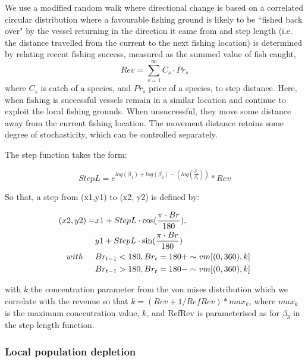 \documentclass[review]{elsarticle}
\begin{document}
We use a modified random walk where directional change is based on a correlated
circular distribution where a favourable fishing ground is likely to be ``fished
back over" by the vessel returning in the direction it came from and step
length (i.e. the distance travelled from the current to the next fishing
location) is determined by relating recent fishing success, measured as the
summed value of fish caught, $$Rev = \sum_{s=1}^{\infty} C_{s} \cdot Pr_{s}$$
where $C_{s}$ is catch of a species, and $Pr_{s}$ price of a species, to step
distance. Here, when fishing is successful vessels remain in a similar location
and continue to exploit the local fishing grounds. When unsuccessful, they move
some distance away from the current fishing location. The movement distance
retains some degree of stochasticity, which can be controlled separately. 

The step function takes the form:

\begin{equation*}
	StepL = e^{log(\beta_{1}) + log(\beta_{2}) - (log(\frac{\beta_{1}}{\beta_{3}}))} * Rev
\end{equation*}

So that, a step from (x1,y1) to (x2, y2) is defined by:

\begin{equation*}
	\begin{split}
 (x2, y2) =  & x1 + StepL \cdot \cos (\frac{\pi \cdot Br}{180}), \\
             & y1 + StepL \cdot \sin (\frac{\pi \cdot Br}{180}) \\	
 with  \hspace{0.5cm}     & Br_{t-1} < 180, Br_{t} = 180 + \sim vm[(0,360), k] \\
 			  & Br_{t-1} > 180, Br_{t} = 180 - \sim vm[(0,360), k] \\
	\end{split}
\end{equation*}

with $k$ the concentration parameter from the von mises distribution which we
correlate with the revenue so that $k = (Rev + 1 / RefRev) * max_{k}$,
where $max_{k}$ is the maximum concentration value, $k$, and RefRev is
parameterised as for $\beta_{3}$ in the step length function. 

\subsubsection{Local population depletion}
\end{document}
